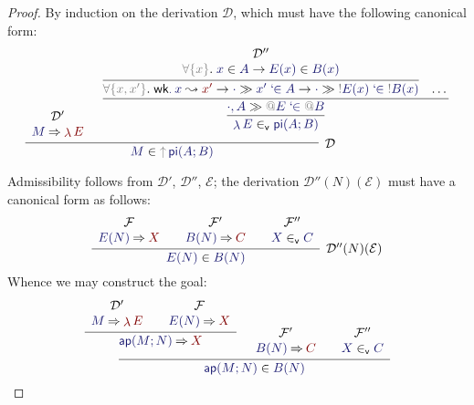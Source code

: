 \documentclass[acmtoplas]{acmtrans2m}
\makeatletter
\def\InputModeColorName{MidnightBlue}
\def\OutputModeColorName{Maroon}
\newcommand\InputMode[1]{{\color{\InputModeColorName}{#1}}}
\newcommand\OutputMode[1]{{\color{\OutputModeColorName}{#1}}}
\newcommand\ap{\mathsf{ap}}
\newcommand\eval[2]{\InputMode{#1}\mathbin{\Rightarrow}\OutputMode{#2}}
\newcommand\thunk[1]{{\color{Gray}\uparrow}#1}
\newcommand\nobind[1]{{\color{Gray}!}#1}
\newcommand\tacitbind[1]{{\color{Gray}@}#1}
\newcommand\mem[2]{\InputMode{#1}\in\InputMode{#2}}
\newcommand\canmem[2]{\InputMode{#1}\in_\mathsf{v}\InputMode{#2}}
\newcommand\lfpi[2]{{\color{Gray}\forall\{#1\}}.\;#2}
\newcommand\weaken[3]{\mathsf{wk}_{\InputMode{#1}}\,\InputMode{#2}\leadsto\OutputMode{#3}}
\newcommand\qmem[2]{#1\;`\!\!\in#2}
\DeclareMathOperator{\typi}{\mathsf{pi}}
\DeclareMathOperator{\lam}{\mathsf{\lambda}}
\newcommand\sequent[2]{\InputMode{#1}\gg\InputMode{#2}}
\makeatother
\begin{document}
\begin{proof}
  By induction on the derivation $\mathcal{D}$, which must have the following canonical form:
  \[
     \infer[\mathcal{D}]{
       \mem{M}{\thunk{\typi(A;B)}}
     }{
       \begin{array}{c}
         \mathcal{D}' \\
         \eval{M}{\lam E}
       \end{array} &
       \infer{
         \canmem{\lam E}{\typi(A;B)}
       }{
         \infer{
           \sequent{\cdot,A}{\qmem{\tacitbind{E}}{\tacitbind{B}}}
         }{
           \infer{
             \lfpi{x,x'}{
               \weaken{\cdot}{x}{x'}
               \to\sequent{\cdot}{\qmem{x'}{A}}
               \to\sequent{\cdot}{\qmem{\nobind{E(x)}}{\nobind{B(x)}}}
             }
           }{
             \begin{array}{c}
               \mathcal{D}''\\
               \lfpi{x}{\mem{x}{A} \to \mem{E(x)}{B(x)}}
             \end{array}
           } &
           \dots
         }
       }
     }
  \]

  Admissibility follows from $\mathcal{D}'$, $\mathcal{D}''$, $\mathcal{E}$;
  the derivation $\mathcal{D''}(N)(\mathcal{E})$ must have a canonical form as follows:
  \[
    \infer[\mathcal{D''}(N)(\mathcal{E})]{
      \mem{E(N)}{B(N)}
    }{
      \begin{array}{c}
        \mathcal{F}\\
        \eval{E(N)}{X}
      \end{array} &
      \begin{array}{c}
        \mathcal{F}'\\
        \eval{B(N)}{C}
      \end{array} &
      \begin{array}{c}
        \mathcal{F}''\\
        \canmem{X}{C}
      \end{array}
    }
  \]
  Whence we may construct the goal:
  \[
    \infer{
      \mem{\ap(M;N)}{B(N)}
    }{
      \infer{
        \eval{\ap(M;N)}{X}
      }{
        \begin{array}{c}
          \mathcal{D}'\\
          \eval{M}{\lam E}
        \end{array} &
        \begin{array}{c}
          \mathcal{F}\\
          \eval{E(N)}{X}
        \end{array}
      }&
      \begin{array}{c}
        \mathcal{F}'\\
        \eval{B(N)}{C}
      \end{array}&
      \begin{array}{c}
        \mathcal{F}''\\
        \canmem{X}{C}
      \end{array}
    }
  \]
\end{proof}
\end{document}
